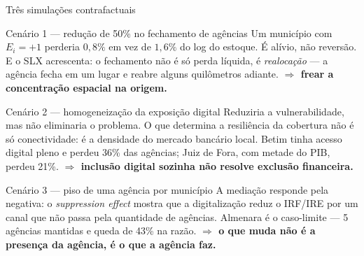 \documentclass[aspectratio=169,10pt]{beamer}
\newcommand{\az}[1]{\textcolor{cedazul}{\textbf{#1}}}
\newcommand{\ex}{E_i}
\begin{document}
\begin{frame}{Três simulações contrafactuais}
  \small
  \begin{block}{Cenário 1 --- redução de 50\% no fechamento de agências}
    \footnotesize
    Um município com $\ex = +1$ perderia $0{,}8\%$ em vez de $1{,}6\%$ do log do
    estoque. É alívio, não reversão. E o SLX acrescenta: o fechamento não é só perda
    líquida, é \emph{realocação} --- a agência fecha em um lugar e reabre alguns
    quilômetros adiante. \hfill\az{$\Rightarrow$ frear a concentração espacial na origem.}
  \end{block}
  \begin{block}{Cenário 2 --- homogeneização da exposição digital}
    \footnotesize
    Reduziria a vulnerabilidade, mas não eliminaria o problema. O que determina a
    resiliência da cobertura não é só conectividade: é a densidade do mercado
    bancário local. Betim tinha acesso digital pleno e perdeu 36\% das agências;
    Juiz de Fora, com metade do PIB, perdeu 21\%.
    \hfill\az{$\Rightarrow$ inclusão digital sozinha não resolve exclusão financeira.}
  \end{block}
  \begin{block}{Cenário 3 --- piso de uma agência por município}
    \footnotesize
    A mediação responde pela negativa: o \emph{suppression effect} mostra que a
    digitalização reduz o IRF/IRE por um canal que não passa pela quantidade de
    agências. Almenara é o caso-limite --- 5 agências mantidas e queda de 43\% na
    razão. \hfill\az{$\Rightarrow$ o que muda não é a presença da agência, é o que a agência faz.}
  \end{block}
\end{frame}
\end{document}
